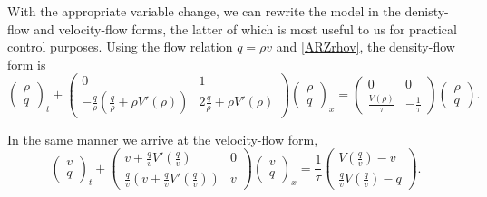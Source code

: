 \documentclass[preprint]{elsarticle}
\begin{document}
With the appropriate variable change, we can rewrite the model in the denisty-flow and velocity-flow forms, the latter of which is most useful to us for practical control purposes. Using the flow relation $q = \rho v$ and \eqref{ARZrhov}, the density-flow form is
\begin{equation} \label{ARZrhoq}
\begin{pmatrix}
\rho \\ q
\end{pmatrix}_t
+ \begin{pmatrix}
0 & 1 \\
-\frac{q}{\rho} \left(\frac{q}{\rho} + \rho V'(\rho) \right) & 2\frac{q}{\rho} + \rho V'(\rho) 
\end{pmatrix}
\begin{pmatrix}
\rho \\ q
\end{pmatrix}_x = 
\begin{pmatrix}
0 & 0 \\ 
\frac{V(\rho)}{\tau} & -\frac{1}{\tau}
\end{pmatrix} 
\begin{pmatrix}
\rho \\ q
\end{pmatrix}.
\end{equation}

In the same manner we arrive at the velocity-flow form,
\begin{equation} \label{ARZvq}
\begin{pmatrix}
v \\ q
\end{pmatrix}_t
+ \begin{pmatrix}
v + \frac{q}{v} V'\left(\frac{q}{v}\right) & 0 \\
\frac{q}{v} \left( v + \frac{q}{v} V'\left(\frac{q}{v}\right)\right) & v
\end{pmatrix}
\begin{pmatrix}
v \\ q
\end{pmatrix}_x = 
\dfrac{1}{\tau}
\begin{pmatrix}
V\left( \frac{q}{v}\right) - v \\
\frac{q}{v}V\left( \frac{q}{v}\right) - q
\end{pmatrix}.
\end{equation}
\end{document}
